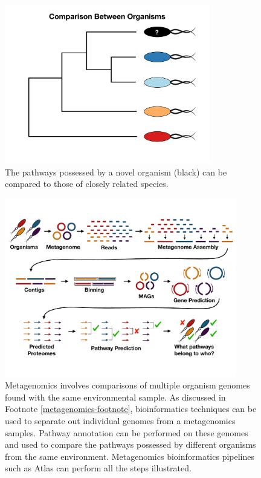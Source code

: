 \begin{figure}[!ht]
  \centering
	\includegraphics[width=0.8\textwidth]{media/compare-phylogenetically.pdf}
	 \caption{The pathways possessed by a novel organism (black) can be compared to those of closely related species.}
	 \label{fig:phylogenetic-comparison}
\end{figure}

\begin{figure}[!ht]
  \centering
	\includegraphics[width=0.9\textwidth]{media/metagenomics.pdf}
	 \caption{Metagenomics involves comparisons of multiple organism genomes found with the same environmental sample. As discussed in Footnote \ref{metagenomics-footnote}, bioinformatics techniques can be used to separate out individual genomes from a metagenomics samples. Pathway annotation can be performed on these genomes and used to compare the pathways possessed by different organisms from the same environment. Metagenomics bioinformatics pipelines such as Atlas can perform all the steps illustrated.}
	 \label{fig:metagenomics}
\end{figure}

